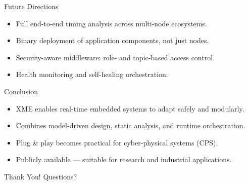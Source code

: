 \documentclass{beamer}
\begin{document}
\begin{frame}{Future Directions}
  \begin{itemize}
    \item Full end-to-end timing analysis across multi-node ecosystems.
    \item Binary deployment of application components, not just nodes.
    \item Security-aware middleware: role- and topic-based access control.
    \item Health monitoring and self-healing orchestration.
  \end{itemize}
\end{frame}

\begin{frame}{Conclusion}
  \begin{itemize}
    \item XME enables real-time embedded systems to adapt safely and modularly.
    \item Combines model-driven design, static analysis, and runtime orchestration.
    \item Plug \& play becomes practical for cyber-physical systems (CPS).
    \item Publicly available — suitable for research and industrial applications.
  \end{itemize}
\end{frame}

\begin{frame}{Thank You!}
  \centering
  \Huge Questions?
\end{frame}
\end{document}
